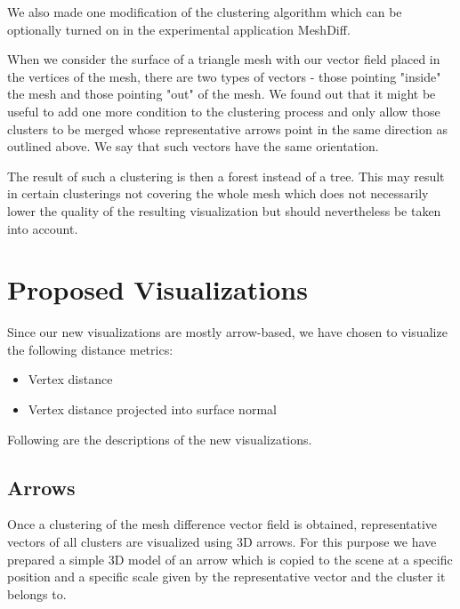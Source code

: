 We also made one modification of the clustering algorithm which can be optionally turned on in the experimental application MeshDiff.

When we consider the surface of a triangle mesh with our vector field placed in the vertices of the mesh, there are two types of vectors - those pointing "inside" the mesh and those pointing "out" of the mesh. We found out that it might be useful to add one more condition to the clustering process and only allow those clusters to be merged whose representative arrows point in the same direction as outlined above. We say that such vectors have the same orientation.

The result of such a clustering is then a forest instead of a tree. This may result in certain clusterings not covering the whole mesh which does not necessarily lower the quality of the resulting visualization but should nevertheless be taken into account.
\section{Proposed Visualizations}

Since our new visualizations are mostly arrow-based, we have chosen to visualize the following distance metrics:

\begin{itemize}
\item Vertex distance
\item Vertex distance projected into surface normal
\end{itemize}

Following are the descriptions of the new visualizations.

\subsection{Arrows}

Once a clustering of the mesh difference vector field is obtained, representative vectors of all clusters are visualized using 3D arrows. For this purpose we have prepared a simple 3D model of an arrow which is copied to the scene at a specific position and a specific scale given by the representative vector and the cluster it belongs to.

